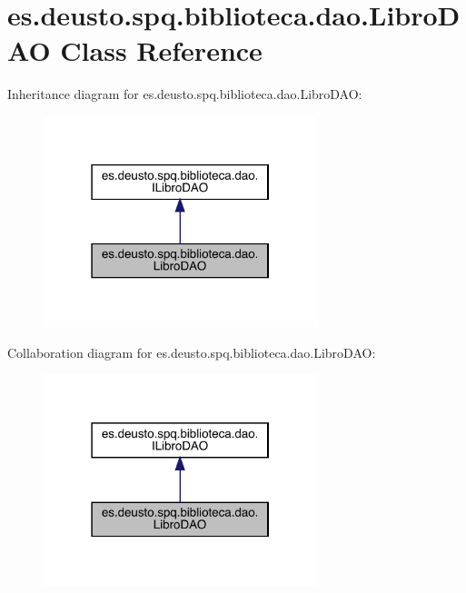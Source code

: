 \hypertarget{classes_1_1deusto_1_1spq_1_1biblioteca_1_1dao_1_1_libro_d_a_o}{}\section{es.\+deusto.\+spq.\+biblioteca.\+dao.\+Libro\+D\+AO Class Reference}
\label{classes_1_1deusto_1_1spq_1_1biblioteca_1_1dao_1_1_libro_d_a_o}


Inheritance diagram for es.\+deusto.\+spq.\+biblioteca.\+dao.\+Libro\+D\+AO\+:
\nopagebreak
\begin{figure}[H]
\begin{center}
\leavevmode
\includegraphics[width=226pt]{classes_1_1deusto_1_1spq_1_1biblioteca_1_1dao_1_1_libro_d_a_o__inherit__graph}
\end{center}
\end{figure}


Collaboration diagram for es.\+deusto.\+spq.\+biblioteca.\+dao.\+Libro\+D\+AO\+:
\nopagebreak
\begin{figure}[H]
\begin{center}
\leavevmode
\includegraphics[width=226pt]{classes_1_1deusto_1_1spq_1_1biblioteca_1_1dao_1_1_libro_d_a_o__coll__graph}
\end{center}
\end{figure}
